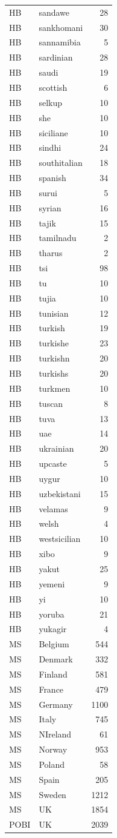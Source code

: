 \begin{longtable}[t]{llr}
HB & sandawe & 28\\
HB & sankhomani & 30\\
HB & sannamibia & 5\\
HB & sardinian & 28\\
HB & saudi & 19\\
HB & scottish & 6\\
HB & selkup & 10\\
HB & she & 10\\
HB & siciliane & 10\\
HB & sindhi & 24\\
HB & southitalian & 18\\
HB & spanish & 34\\
HB & surui & 5\\
HB & syrian & 16\\
HB & tajik & 15\\
HB & tamilnadu & 2\\
HB & tharus & 2\\
HB & tsi & 98\\
HB & tu & 10\\
HB & tujia & 10\\
HB & tunisian & 12\\
HB & turkish & 19\\
HB & turkishe & 23\\
HB & turkishn & 20\\
HB & turkishs & 20\\
HB & turkmen & 10\\
HB & tuscan & 8\\
HB & tuva & 13\\
HB & uae & 14\\
HB & ukrainian & 20\\
HB & upcaste & 5\\
HB & uygur & 10\\
HB & uzbekistani & 15\\
HB & velamas & 9\\
HB & welsh & 4\\
HB & westsicilian & 10\\
HB & xibo & 9\\
HB & yakut & 25\\
HB & yemeni & 9\\
HB & yi & 10\\
HB & yoruba & 21\\
HB & yukagir & 4\\
MS & Belgium & 544\\
MS & Denmark & 332\\
MS & Finland & 581\\
MS & France & 479\\
MS & Germany & 1100\\
MS & Italy & 745\\
MS & NIreland & 61\\
MS & Norway & 953\\
MS & Poland & 58\\
MS & Spain & 205\\
MS & Sweden & 1212\\
MS & UK & 1854\\
POBI & UK & 2039\\*
\end{longtable}
